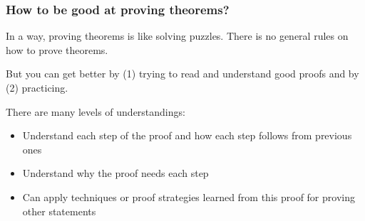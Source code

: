 \begin{frame}\frametitle{How to be good at proving theorems?}
  In a way, proving theorems is like solving puzzles.  There is no
  general rules on how to prove theorems.

  \pause
  But you can get better by (1) trying to read and understand good
  proofs and by (2) practicing.

  \pause
  \vspace{0.2in}
  
  There are many levels of understandings:
  \pause
  
  \begin{itemize}
  \item Understand each step of the proof and how each step follows
    from previous ones
    \pause
  \item Understand why the proof needs each step
    \pause
  \item Can apply techniques or proof strategies learned from this
    proof for proving other statements
  \end{itemize}
\end{frame}
